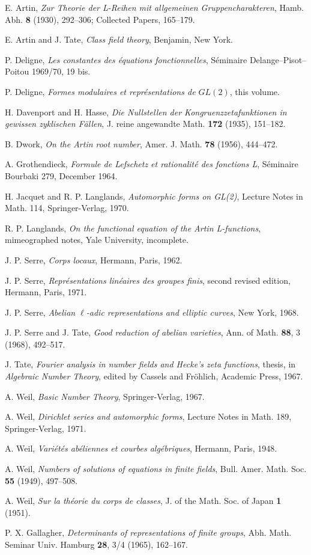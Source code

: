 \documentclass[10pt]{article}
\begin{document}
\begin{enumerate}[label={[\arabic*]},leftmargin=2.8em]
\item E. Artin, \emph{Zur Theorie der L-Reihen mit allgemeinen Gruppencharakteren}, Hamb. Abh. \textbf{8} (1930), 292--306; Collected Papers, 165--179.
\item E. Artin and J. Tate, \emph{Class field theory}, Benjamin, New York.
\item P. Deligne, \emph{Les constantes des équations fonctionnelles}, Séminaire Delange--Pisot--Poitou 1969/70, 19 bis.
\item P. Deligne, \emph{Formes modulaires et représentations de \(GL(2)\)}, this volume.
\item H. Davenport and H. Hasse, \emph{Die Nullstellen der Kongruenzzetafunktionen in gewissen zyklischen Fällen}, J. reine angewandte Math. \textbf{172} (1935), 151--182.
\item B. Dwork, \emph{On the Artin root number}, Amer. J. Math. \textbf{78} (1956), 444--472.
\item A. Grothendieck, \emph{Formule de Lefschetz et rationalité des fonctions L}, Séminaire Bourbaki 279, December 1964.
\item H. Jacquet and R. P. Langlands, \emph{Automorphic forms on GL(2)}, Lecture Notes in Math. 114, Springer-Verlag, 1970.
\item R. P. Langlands, \emph{On the functional equation of the Artin L-functions}, mimeographed notes, Yale University, incomplete.
\item J. P. Serre, \emph{Corps locaux}, Hermann, Paris, 1962.
\item J. P. Serre, \emph{Représentations linéaires des groupes finis}, second revised edition, Hermann, Paris, 1971.
\item J. P. Serre, \emph{Abelian \(\ell\)-adic representations and elliptic curves}, New York, 1968.
\item J. P. Serre and J. Tate, \emph{Good reduction of abelian varieties}, Ann. of Math. \textbf{88}, 3 (1968), 492--517.
\item J. Tate, \emph{Fourier analysis in number fields and Hecke's zeta functions}, thesis, in \emph{Algebraic Number Theory}, edited by Cassels and Fröhlich, Academic Press, 1967.
\item A. Weil, \emph{Basic Number Theory}, Springer-Verlag, 1967.
\item A. Weil, \emph{Dirichlet series and automorphic forms}, Lecture Notes in Math. 189, Springer-Verlag, 1971.
\item A. Weil, \emph{Variétés abéliennes et courbes algébriques}, Hermann, Paris, 1948.
\item A. Weil, \emph{Numbers of solutions of equations in finite fields}, Bull. Amer. Math. Soc. \textbf{55} (1949), 497--508.
\item A. Weil, \emph{Sur la théorie du corps de classes}, J. of the Math. Soc. of Japan \textbf{1} (1951).
\item P. X. Gallagher, \emph{Determinants of representations of finite groups}, Abh. Math. Seminar Univ. Hamburg \textbf{28}, 3/4 (1965), 162--167.
\end{enumerate}
\end{document}
